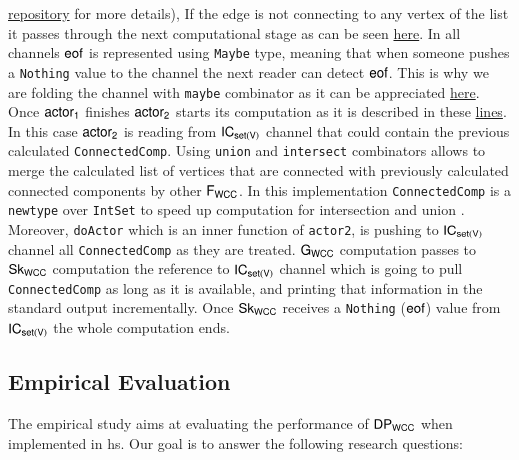 \href{https://github.com/jproyo/upc-miri-tfm/blob/17ee929f64a8be8a88ced782bfcf6bf355d8580a/connected-comp/src/ConnComp/Internal.hs#L50-L73}{repository} for more details), If the edge is not connecting to any vertex of the list it passes through the next computational stage as can be seen \href{https://github.com/jproyo/upc-miri-tfm/blob/17ee929f64a8be8a88ced782bfcf6bf355d8580a/connected-comp/src/ConnComp/Internal.hs#L55-L59}{here}. In all channels $\mathsf{eof}$ is represented using \texttt{Maybe} type, meaning that when someone pushes a \texttt{Nothing} value to the channel the next reader can detect $\mathsf{eof}$. This is why we are folding the channel with \texttt{maybe} combinator as it can be appreciated \href{https://github.com/jproyo/upc-miri-tfm/blob/17ee929f64a8be8a88ced782bfcf6bf355d8580a/connected-comp/src/ConnComp/Internal.hs#L51}{here}. Once $\mathsf{actor_1}$ finishes $\mathsf{actor_2}$ starts its computation as it is described in these \href{https://github.com/jproyo/upc-miri-tfm/blob/17ee929f64a8be8a88ced782bfcf6bf355d8580a/connected-comp/src/ConnComp/Internal.hs#L62-L73}{lines}. In this case $\mathsf{actor_2}$ is reading from $\mathsf{IC_{set(V)}}$ channel that could contain the previous calculated \texttt{ConnectedComp}. Using \texttt{union} and \texttt{intersect} combinators allows to merge the calculated list of vertices that are connected with previously calculated connected components by other $\mathsf{F_{WCC}}$. In this implementation \texttt{ConnectedComp} is a \texttt{newtype} over \texttt{IntSet} to speed up computation for intersection and union \cite{containers}. Moreover,  \texttt{doActor} which is an inner function of \texttt{actor2}, is pushing to $\mathsf{IC_{set(V)}}$ channel all \texttt{ConnectedComp} as they are treated. $\mathsf{G_{WCC}}$ computation passes to $\mathsf{Sk_{WCC}}$ computation the reference to $\mathsf{IC_{set(V)}}$ channel which is going to pull \texttt{ConnectedComp} as long as it is available, and printing that information in the standard output incrementally. Once $\mathsf{Sk_{WCC}}$ receives a \texttt{Nothing} ($\mathsf{eof}$) value from $\mathsf{IC_{set(V)}}$ the whole computation ends.
  
  
  \subsection{Empirical Evaluation}\label{sec:evaluation}
  The empirical study aims at evaluating the performance of $\mathsf{DP_{WCC}}$ when implemented in \acrshort{hs}. 
  Our goal is to answer the following research questions: 
  
